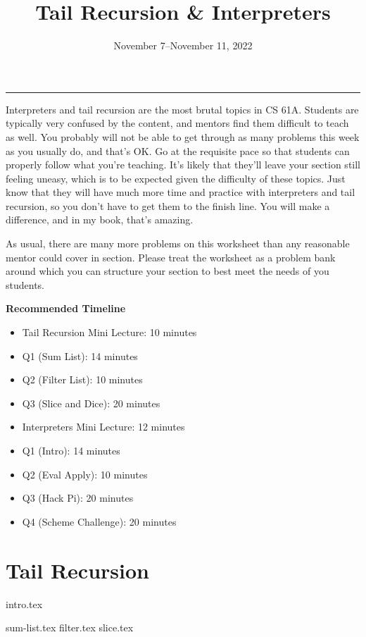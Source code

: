 \documentclass{exam}
\title{Tail Recursion \& Interpreters}
\date{November 7--November 11, 2022}
\begin{document}
\maketitle
\rule{\textwidth}{0.15em}

\begin{meta}
    Interpreters and tail recursion are the most brutal topics in CS 61A.
    Students are typically very confused by the content, and mentors find them difficult to
    teach as well. You probably will not be able to get through as many problems this
    week as you usually do, and that's OK. Go at the requisite pace so that students
    can properly follow what you're teaching. It's likely that they'll leave your 
    section still feeling uneasy, which is to be expected given the difficulty
    of these topics. Just know that they will have much more time and practice with
    interpreters and tail recursion, so you don't have to get them to the finish line.
    You will make a difference, and in my book, that's amazing. 

    As usual, there are many more problems on this worksheet than any reasonable mentor
    could cover in section. Please treat the worksheet as a problem bank around which
    you can structure your section to best meet the needs of you students. 

    \textbf{Recommended Timeline}
    \begin{itemize}
        \item Tail Recursion Mini Lecture: 10 minutes
        \item Q1 (Sum List): 14 minutes
        \item Q2 (Filter List): 10 minutes
        \item Q3 (Slice and Dice): 20 minutes
        \item Interpreters Mini Lecture: 12 minutes
        \item Q1 (Intro): 14 minutes
        \item Q2 (Eval Apply): 10 minutes
        \item Q3 (Hack Pi): 20 minutes
        \item Q4 (Scheme Challenge): 20 minutes
    \end{itemize}
\newpage
\end{meta}

\section{Tail Recursion}
{intro.tex}
\vspace{1in}
\begin{questions}
    {sum-list.tex}
    {filter.tex}
    {slice.tex}
\end{questions}
\end{document}
